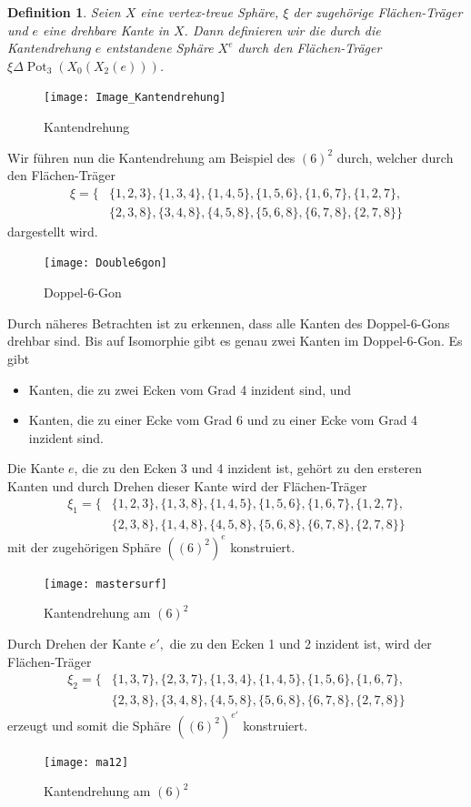 \documentclass[12pt,titlepage,twoside,cleardoublepage]{article}
\theoremstyle{nummermitklammern}
\newtheorem{definition}[temp]{Definition}
\newtheorem{definition}[zahl]{Definition}
\numberwithin{equation}{section}
\DeclareMathOperator{\Pot}{Pot}
\begin{document}
\begin{definition}
Seien $X$ eine vertex-treue Sphäre, $\xi$ der zugehörige Flächen-Träger und $e$ eine drehbare Kante in $X$. Dann definieren wir die \emph{durch die Kantendrehung $e$ entstandene Sphäre} $X^e$ durch den Flächen-Träger $\xi \Delta \Pot_3(X_0(X_2(e)))$.
\end{definition}
\begin{figure}[H]
\begin{center}
\texttt{[image: Image\_Kantendrehung]}
\end{center}
\caption{Kantendrehung}
\end{figure}
 Wir führen nun die Kantendrehung am Beispiel des $(6)^2$  durch, welcher durch den Flächen-Träger
\begin{align*}
\xi=\{&\{1,2,3\},\{1,3,4\},\{1,4,5\},\{1,5,6\},\{1,6,7\},\{1,2,7\},\\ 
&\{2,3,8\},\{3,4,8\},\{4,5,8\},\{5,6,8\},\{6,7,8\},\{2,7,8\}\}
\end{align*}
dargestellt wird. 
\begin{figure}[H]
\begin{center}
\texttt{[image: Double6gon]}
\end{center}
\caption{Doppel-6-Gon}
\end{figure}
Durch näheres Betrachten ist zu erkennen, dass alle Kanten des Doppel-6-Gons drehbar sind. Bis auf Isomorphie gibt es genau zwei Kanten im Doppel-6-Gon. Es gibt 
\begin{itemize}
\item Kanten, die zu zwei Ecken vom Grad 4 inzident sind, und
\item Kanten, die zu einer Ecke vom Grad 6 und zu einer Ecke vom Grad 4 inzident sind.
\end{itemize} 
Die Kante $e$, die zu den Ecken 3 und 4 inzident ist, gehört zu den ersteren Kanten und durch Drehen dieser Kante wird der Flächen-Träger 
\begin{align*}
\xi_1=\{&\{1,2,3\},\{1,3,8\},\{1,4,5\},\{1,5,6\},\{1,6,7\},\{1,2,7\},\\ 
&\{2,3,8\},\{1,4,8\},\{4,5,8\},\{5,6,8\},\{6,7,8\},\{2,7,8\}\}
\end{align*}
mit der zugehörigen Sphäre ${((6)^2)}^e$ konstruiert.
\begin{figure}[H]
\begin{center}
\texttt{[image: mastersurf]}
\end{center}
\caption{Kantendrehung am $(6)^2$ }
\end{figure}
 Durch Drehen der Kante $e',$ die zu den Ecken 1 und 2 inzident ist, wird der Flächen-Träger 
\begin{align*}
\xi_2=\{&\{1,3,7\},\{2,3,7\},\{1,3,4\},\{1,4,5\},\{1,5,6\},\{1,6,7\},\\ 
&\{2,3,8\},\{3,4,8\},\{4,5,8\},\{5,6,8\},\{6,7,8\},\{2,7,8\}\}
\end{align*}
erzeugt und somit die Sphäre ${((6)^2)}^{e'}$ konstruiert.
\begin{figure}[H]
\begin{center}
\texttt{[image: ma12]}
\end{center}
\caption{Kantendrehung am $(6)^2$ }
\end{figure}
\end{document}
